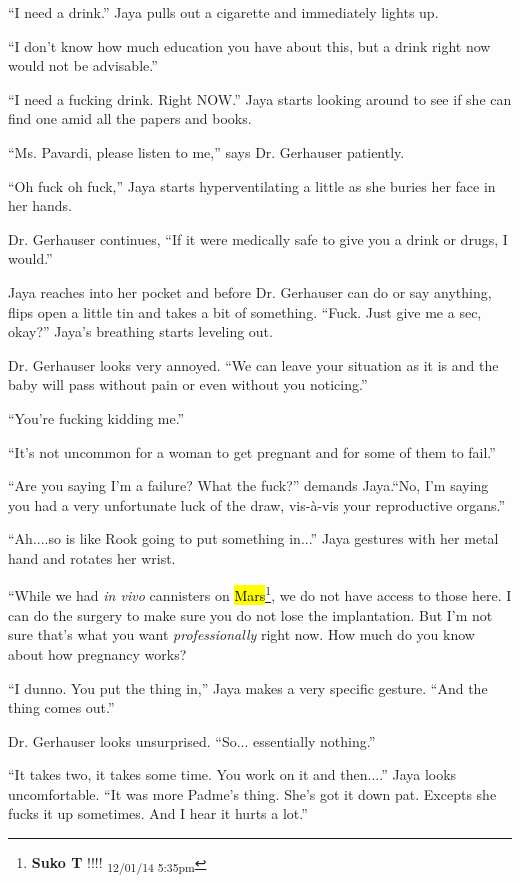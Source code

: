 ``I need a drink.''  Jaya pulls out a cigarette and immediately lights up.

``I don't know how much education you have about this, but a drink right now would not be advisable.''

``I need a fucking drink.  Right NOW.''  Jaya starts looking around to see if she can find one amid all the papers and books.

``Ms. Pavardi, please listen to me,'' says Dr. Gerhauser patiently.

``Oh fuck oh fuck,'' Jaya starts hyperventilating a little as she buries her face in her hands.

Dr. Gerhauser continues, ``If it were medically safe to give you a drink or drugs, I would.''

Jaya reaches into her pocket and before Dr. Gerhauser can do or say anything, flips open a little tin and takes a bit of something.  ``Fuck.  Just give me a sec, okay?''  Jaya's breathing starts leveling out.

Dr. Gerhauser looks very annoyed.  ``We can leave your situation as it is and the baby will pass without pain or even without you noticing.''

``You're fucking kidding me.''

``It's not uncommon for a woman to get pregnant and for some of them to fail.''

``Are you saying I'm a failure? What the fuck?'' demands Jaya.``No, I'm saying you had a very unfortunate luck of the draw, vis-à-vis your reproductive organs.''

``Ah....so is like Rook going to put something in...'' Jaya gestures with her metal hand and rotates her wrist.

``While we had \textit{in vivo} cannisters on \hl{Mars}\footnote{\textbf{Suko T }!!!! \textsubscript{12/01/14 5:35pm}}, we do not have access to those here.  I can do the surgery to make sure you do not lose the implantation.  But I'm not sure that's what you want \textit{professionally }right now. How much do you know about how pregnancy works?

``I dunno.  You put the thing in,'' Jaya makes a very specific gesture. ``And the thing comes out.''

Dr. Gerhauser looks unsurprised. ``So... essentially nothing.'' 

``It takes two, it takes some time.  You work on it and then....'' Jaya looks uncomfortable.  ``It was more Padme's thing.  She's got it down pat.  Excepts she fucks it up sometimes.  And I hear it hurts a lot.''

